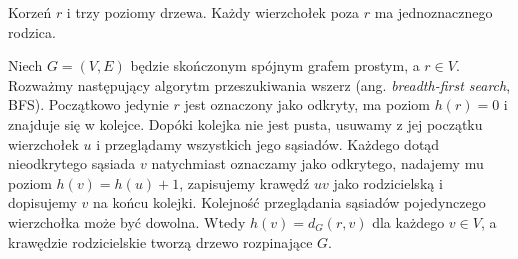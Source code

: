\begin{center}

{\footnotesize Korzeń $r$ i trzy poziomy drzewa.
Każdy wierzchołek poza $r$ ma jednoznacznego rodzica.}
\end{center}

\begin{twierdzenie}
\label{thm:tg-tree-bfs-distance}
Niech $G=(V,E)$ będzie skończonym spójnym
grafem prostym, a $r\in V$. Rozważmy następujący algorytm przeszukiwania wszerz
(ang. \emph{breadth-first search}, BFS).
Początkowo jedynie $r$ jest oznaczony jako odkryty,
ma poziom $h(r)=0$ i znajduje się w kolejce.
Dopóki kolejka nie jest pusta, usuwamy z jej początku
wierzchołek $u$ i przeglądamy wszystkich jego sąsiadów.
Każdego dotąd nieodkrytego sąsiada $v$ natychmiast
oznaczamy jako odkrytego, nadajemy mu poziom
$h(v)=h(u)+1$, zapisujemy krawędź $uv$ jako rodzicielską
i dopisujemy $v$ na końcu kolejki. Kolejność przeglądania
sąsiadów pojedynczego wierzchołka może być dowolna.
Wtedy $h(v)=d_G(r,v)$ dla każdego $v\in V$,
a krawędzie rodzicielskie tworzą drzewo
rozpinające $G$.
\end{twierdzenie}

